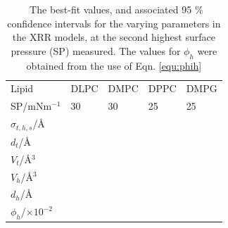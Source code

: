 \documentclass[amsmath,amssymb,superscriptaddress]{revtex4-1}
\begin{document}
\begin{table}
  \centering
	\caption{\ The best-fit values, and associated 95 \% confidence intervals for the varying parameters in the XRR models, at the second highest surface pressure (SP) measured. The values for $\phi_h$ were obtained from the use of Eqn. \ref{equ:phih}}
	\label{tab:liptab2}
	\begin{tabular}{l|l|l|l|l}
		Lipid & DLPC & DMPC & DPPC & DMPG \\
    SP/mNm$^{-1}$ & 30 & 30 & 25 & 25 \\
		\hline
		$\sigma_{t,h,s}$/\AA &  &  &  &  \\
    $d_t$/\AA &  &  &  &  \\
    \hline
    $V_t$/\AA$^3$ &  &  &  &  \\
		$V_h$/\AA$^3$ &  &  &  &  \\
		$d_h$/\AA &  &  &  &  \\
    \hline
    $\phi_h$/$\times10^{-2}$ &  &  &  &  \\
	\end{tabular}
\end{table}
%
%
\end{document}
